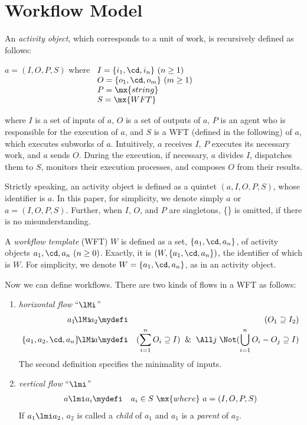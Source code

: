 
\section{Workflow Model}
\label{sec:wfmodel}

An {\em activity object}, which corresponds to a unit of work, 
is recursively defined as follows:
\begin{center}
$a=(I,O,P,S)$ where
 	$\begin{array}[t]{l}
	I=\{i_1,\cd,i_n\}\ (n\ge 1)\\
	O=\{o_1,\cd,o_m\}\ (m\ge 1)\\
	P=\mx{string}\\
	S=\mx{WFT}
	\end{array}$
\end{center}
where $I$ is a set of inputs of $a$, $O$ is a set of outputs of $a$, 
$P$ is an agent who is responsible for the execution of $a$, 
and $S$ is a WFT (defined in the following) of $a$, which executes
subworks of $a$.
Intuitively, $a$ receives $I$, $P$ executes its necessary work, and $a$
sends $O$. 
During the execution, if necessary, $a$ divides $I$, dispatches them
to $S$, monitors their execution processes, and composes $O$ from
their results. 

\begin{sloppypar}
 Strictly speaking, an activity object is defined as a quintet
 $(a,I,O,P,S)$, whose identifier is $a$. 
 In this paper, for simplicity, we denote simply $a$ or $a=(I,O,P,S)$.
 Further, when $I$, $O$, and $P$ are singletons, \{\} is omitted, if
 there is no misunderstanding. 
\end{sloppypar}

A {\em workflow template} (WFT) $W$ is defined as a set,
$\{a_1,\cd,a_n\}$, of activity objects $a_1, \cd, a_n\  (n\ge 0)$. 
Exactly, it is $(W,\{a_1,\cd,a_n\})$, the identifier of which is $W$.
For simplicity, we denote $W=\{a_1,\cd,a_n\}$, as in an activity object.

Now we can define workflows.
There are two kinds of flows in a WFT as follows:
\begin{enumerate}
\item {\em horizontal flow} ``$\lMi$''
\begin{eqnarray*}
a_1\!\lMi\!a_2&\mydefi&(O_1\supseteq I_2)\\
\{a_1,a_2,\cd,a_n\}\!\lMi\!a &\mydefi &
	(\sum_{i=1}^n O_i\supseteq I)\And
		\All j\;\Not(\bigcup_{i=1}^n O_i- O_j\supseteq I)
\end{eqnarray*}
The second definition specifies the minimality of inputs.
\item {\em vertical flow} ``$\lmi$''
\begin{eqnarray*}
a\lmi a_i&\mydefi& a_i\in S\ \mx{where}\ a=(I,O,P,S)
\end{eqnarray*}
If $a_1\lmi a_2$, $a_2$ is called a {\em child} of $a_1$ and $a_1$ is
a {\em parent} of $a_2$.
\end{enumerate}

